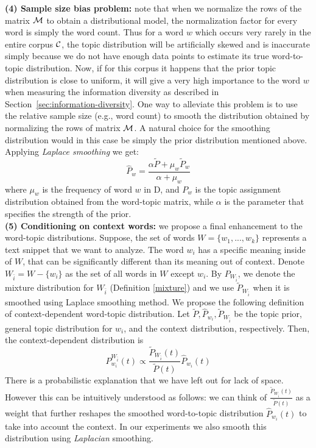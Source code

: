 \documentclass{article} %
\begin{document}
{\bf (4) Sample size bias problem:}  note that 
when we normalize the rows of the matrix ${\mathcal M}$ to obtain a distributional model, the normalization factor 
for every word is simply the word count. Thus for a word $w$ which occurs very rarely
in the entire corpus ${\mathcal C}$, the topic distribution will be artificially skewed and is inaccurate simply because we do not have enough data points to estimate its true word-to-topic distribution.
Now, if for this corpus it happens that the prior topic distribution
is close to uniform, it will give a very high importance to the word
$w$ when measuring the information diversity as described in
Section~\ref{sec:information-diversity}.
One way to alleviate this
problem is to use the relative sample size (e.g., word count) to
smooth the distribution obtained by normalizing the rows of matrix
${\mathcal M}$. A natural choice for the smoothing distribution would in this
case be simply the prior distribution mentioned above. Applying {\em Laplace smoothing}
we get:
\begin{equation}
\widehat{P}_w=\frac{\alpha \tilde{P}+ \mu_w \tilde{P}_w}{\alpha+\mu_w}
\end{equation}
where $\mu_w$ is the frequency of word $w$ in D, and $P_w$ is the
topic assignment distribution obtained from the word-topic matrix,
while $\alpha$ is the parameter that specifies the strength of the
prior.\\
{\bf (5) Conditioning on context words:} we propose a final enhancement to the word-topic
distributions. Suppose, the set of words $W=\{w_1,...,w_k\}$
represents a text snippet that we want to analyze. The word $w_i$ has
a specific meaning inside of $W$, that can be significantly different
than its meaning out of context. Denote
$W_{\bar{i}}=W-\{w_i\}$ as the set of all words in $W$ except
$w_i$. By $P_{W_{\bar{i}}}$, we denote the mixture distribution for $W_{\bar{i}}$ (Definition \ref{mixture}) and we use $\tilde{P}_{W_{\bar{i}}}$ when it is smoothed using Laplace smoothing method. We
propose the following definition of context-dependent word-topic
distribution. 
\bed
Let $\tilde{P},\widehat{P}_{w_i}, \tilde{P}_{W_{\bar{i}}}$ be the topic prior, general
topic distribution for $w_i$, and the context distribution,
respectively. Then, the context-dependent distribution is
\begin{equation*}
P^{W_{\bar{i}}}_{w_i}(t)\propto \frac{\tilde{P}_{W_{\bar{i}}}(t)}{\tilde{P}(t)}\widehat{P}_{w_i}(t)
\end{equation*}
\eed
There is a probabilistic explanation that we have left out for 
lack of space. However this can be intuitively understood as follows:
we can think of $\frac{\tilde{P}_{W_{\bar{i}}}(t)}{\tilde{P}(t)}$ as a weight
that further reshapes the smoothed word-to-topic distribution $\widehat{P}_{w_i}(t)$
to take into account the context. In our experiments we also smooth this distribution
using {\em Laplacian} smoothing.
\end{document}
